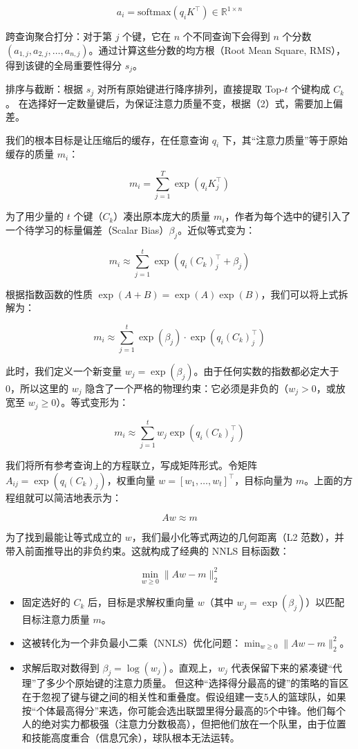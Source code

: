 \[
a_i = \mathrm{softmax}(q_i K^\top) \in \mathbb{R}^{1 \times n}
\]

跨查询聚合打分：对于第 \(j\) 个键，它在 \(n\) 个不同查询下会得到 \(n\) 个分数 \((a_{1,j}, a_{2,j}, \ldots, a_{n,j})\)。通过计算这些分数的均方根（Root Mean Square, RMS），得到该键的全局重要性得分 \(s_j\)。

排序与截断：根据 \(s_j\) 对所有原始键进行降序排列，直接提取 Top-\(t\) 个键构成 \(C_k\)。
在选择好一定数量键后，为保证注意力质量不变，根据（2）式，需要加上偏差。

我们的根本目标是让压缩后的缓存，在任意查询 \(q_i\) 下，其``注意力质量''等于原始缓存的质量 \(m_i\)：

\[
m_i = \sum_{j=1}^{T} \exp(q_i K_j^\top)
\]

为了用少量的 \(t\) 个键（\(C_k\)）凑出原本庞大的质量 \(m_i\)，作者为每个选中的键引入了一个待学习的标量偏差（Scalar Bias）\(\beta_j\)。近似等式变为：

\[
m_i \approx \sum_{j=1}^{t} \exp(q_i (C_k)_j^\top + \beta_j)
\]

根据指数函数的性质 \(\exp(A + B) = \exp(A)\exp(B)\)，我们可以将上式拆解为：

\[
m_i \approx \sum_{j=1}^{t} \exp(\beta_j) \cdot \exp(q_i (C_k)_j^\top)
\]

此时，我们定义一个新变量 \(w_j = \exp(\beta_j)\)。由于任何实数的指数都必定大于 0，所以这里的 \(w_j\) 隐含了一个严格的物理约束：它必须是非负的（\(w_j > 0\)，或放宽至 \(w_j \ge 0\)）。等式变形为：

\[
m_i \approx \sum_{j=1}^{t} w_j \exp(q_i (C_k)_j^\top)
\]

我们将所有参考查询上的方程联立，写成矩阵形式。令矩阵 \(A_{ij} = \exp(q_i (C_k)_j)\)，权重向量 \(w = [w_1,\ldots,w_t]^\top\)，目标向量为 \(m\)。上面的方程组就可以简洁地表示为：

\[
Aw \approx m
\]

为了找到最能让等式成立的 \(w\)，我们最小化等式两边的几何距离（L2 范数），并带入前面推导出的非负约束。这就构成了经典的 NNLS 目标函数：

\[
\min_{w \ge 0}\|Aw - m\|_2^2
\]

\begin{itemize}
\tightlist
\item
  固定选好的 \(C_k\) 后，目标是求解权重向量 \(w\)（其中 \(w_j = \exp(\beta_j)\)）以匹配目标注意力质量 \(m\)。
\item
  这被转化为一个非负最小二乘（NNLS）优化问题：\(\min_{w \ge 0}\|Aw - m\|_2^2\)。
\item
  求解后取对数得到 \(\beta_j = \log(w_j)\)。直观上，\(w_j\) 代表保留下来的紧凑键``代理''了多少个原始键的注意力质量。
  但这种``选择得分最高的键''的策略的盲区在于忽视了键与键之间的相关性和重叠度。假设组建一支5人的篮球队，如果按``个体最高得分''来选，你可能会选出联盟里得分最高的5个中锋。他们每个人的绝对实力都极强（注意力分数极高），但把他们放在一个队里，由于位置和技能高度重合（信息冗余），球队根本无法运转。
\end{itemize}

